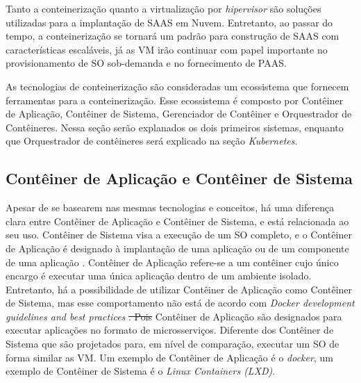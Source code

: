\documentclass[
	12pt,				%
	openright,			%
	oneside,			%
	a4paper,			%
	brazil				%
	]{abntex2}
\providecommand{\DIFaddtex}[1]{{\protect\color{blue}\uwave{#1}}} %
\providecommand{\DIFdeltex}[1]{{\protect\color{red}\sout{#1}}}                      %
\providecommand{\DIFaddbegin}{} %
\providecommand{\DIFaddend}{} %
\providecommand{\DIFdelbegin}{} %
\providecommand{\DIFdelend}{} %
\providecommand{\DIFadd}[1]{\texorpdfstring{\DIFaddtex{#1}}{#1}} %
\providecommand{\DIFdel}[1]{\texorpdfstring{\DIFdeltex{#1}}{}} %
\newcommand{\DIFscaledelfig}{0.5}
\newlength{\DIFdelgraphicswidth} %
\newlength{\DIFdelgraphicsheight} %
\newcommand{\DIFaddincludegraphics}[2][]{{\color{blue}\fbox{\DIFOincludegraphics[#1]{#2}}}} %
\newcommand{\DIFdelincludegraphics}[2][]{%
\sbox{\DIFdelgraphicsbox}{\DIFOincludegraphics[#1]{#2}}%
\settoboxwidth{\DIFdelgraphicswidth}{\DIFdelgraphicsbox} %
\settoboxtotalheight{\DIFdelgraphicsheight}{\DIFdelgraphicsbox} %
\scalebox{\DIFscaledelfig}{%
\parbox[b]{\DIFdelgraphicswidth}{\usebox{\DIFdelgraphicsbox}\\[-\baselineskip] \rule{\DIFdelgraphicswidth}{0em}}\llap{\resizebox{\DIFdelgraphicswidth}{\DIFdelgraphicsheight}{%
\setlength{\unitlength}{\DIFdelgraphicswidth}%
\begin{picture}(1,1)%
\thicklines\linethickness{2pt} %
{\color[rgb]{1,0,0}\put(0,0){\framebox(1,1){}}}%
{\color[rgb]{1,0,0}\put(0,0){\line( 1,1){1}}}%
{\color[rgb]{1,0,0}\put(0,1){\line(1,-1){1}}}%
\end{picture}%
}\hspace*{3pt}}} %
} %
\DeclareRobustCommand{\DIFaddbegin}{\DIFOaddbegin \let\includegraphics\DIFaddincludegraphics} %
\DeclareRobustCommand{\DIFaddend}{\DIFOaddend \let\includegraphics\DIFOincludegraphics} %
\DeclareRobustCommand{\DIFdelbegin}{\DIFOdelbegin \let\includegraphics\DIFdelincludegraphics} %
\DeclareRobustCommand{\DIFdelend}{\DIFOaddend \let\includegraphics\DIFOincludegraphics} %
\begin{document}
Tanto a conteinerização quanto a virtualização por \textit{hipervisor} são soluções utilizadas para a implantação de \ac{SAAS} em Nuvem. Entretanto, ao passar do tempo, a conteinerização se tornará um padrão para construção de \ac{SAAS} com características escaláveis, já as \ac{VM} irão continuar com papel importante no provisionamento de \ac{SO} sob-demanda e no fornecimento de \ac{PAAS}.
\DIFdelbegin %

\DIFdelend %
As tecnologias de conteinerização são consideradas um ecossistema que fornecem ferramentas para a conteinerização. Esse ecossistema é composto por Contêiner de Aplicação, Contêiner de Sistema, Gerenciador de Contêiner e Orquestrador de Contêineres. Nessa seção serão explanados os dois primeiros sistemas, enquanto que Orquestrador de contêineres será explicado na seção \textit{Kubernetes}.

\subsection{Contêiner de Aplicação e Contêiner de Sistema}
Apesar de se basearem nas mesmas tecnologias e conceitos, há uma diferença clara entre Contêiner de Aplicação e Contêiner de Sistema, e está relacionada ao seu uso. Contêiner de Sistema visa a execução de um \ac{SO} completo, e o Contêiner de Aplicação é designado à implantação de uma aplicação ou de um componente de uma aplicação \newline {}. Contêiner de Aplicação refere-se a um contêiner cujo único encargo é executar uma única aplicação dentro de um ambiente isolado. Entretanto, há a possibilidade de utilizar Contêiner de Aplicação como Contêiner de Sistema, mas esse comportamento não está de acordo com \textit{Docker development guidelines and best practices} \cite{berg2016guidelines}\DIFdelbegin \DIFdel{. Pois }\DIFdelend \DIFaddbegin \DIFadd{, pois }\DIFaddend Contêiner de Aplicação são designados para executar aplicações no formato de microsserviços. Diferente dos Contêiner de Sistema que são projetados para, em nível de comparação, executar um \ac{SO} de forma similar as \ac{VM}. Um exemplo de Contêiner de Aplicação é o \textit{docker}, um exemplo de Contêiner de Sistema é o \textit{Linux Containers (LXD)}.

\end{document}
